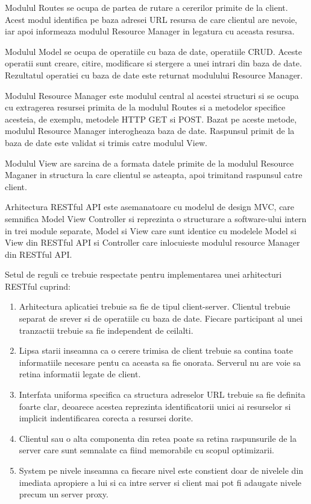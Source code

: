 Modulul Routes se ocupa de partea de rutare a cererilor primite de la client. Acest modul identifica pe baza adresei URL resursa de care clientul are nevoie, 
iar apoi informeaza modulul Resource Manager in legatura cu aceasta resursa.

Modulul Model se ocupa de operatiile cu baza de date, operatiile CRUD. Aceste operatii sunt creare, citire, modificare si stergere a unei intrari din 
baza de date. Rezultatul operatiei cu baza de date este returnat modulului Resource Manager.

Modulul Resource Manager este modulul central al acestei structuri si se ocupa cu extragerea resursei primita de la modulul Routes si a metodelor specifice 
acesteia, de exemplu, metodele HTTP GET si POST. Bazat pe aceste metode, modulul Resource Manager interogheaza baza de date. Raspunsul primit de la baza de date 
este validat si trimis catre modulul View.

Modulul View are sarcina de a formata datele primite de la modulul Resource Maganer in structura la care clientul se asteapta, apoi trimitand raspunsul catre 
client. 

Arhitectura RESTful API este asemanatoare cu modelul de design MVC, care semnifica Model View Controller si reprezinta o structurare a software-ului intern 
in trei module separate, Model si View care sunt identice cu modelele Model si View din RESTful API si Controller care inlocuieste modulul resource Manager 
din RESTful API.

Setul de reguli ce trebuie respectate pentru implementarea unei arhitecturi RESTful cuprind:
\begin{enumerate}
	\item Arhitectura aplicatiei trebuie sa fie de tipul client-server. Clientul trebuie separat de srever si de operatiile cu baza de date. Fiecare 
    participant al unei tranzactii trebuie sa fie independent de ceilalti.
	\item Lipsa starii inseamna ca o cerere trimisa de client trebuie sa contina toate informatiile necesare pentu ca aceasta sa fie onorata. Serverul 
	nu are voie sa retina informatii legate de client.
    \item Interfata uniforma specifica ca structura adreselor URL trebuie sa fie definita foarte clar, deoarece acestea reprezinta identificatorii unici 
    ai resurselor si implicit indentificarea corecta a resursei dorite.
    \item Clientul sau o alta componenta din retea poate sa retina raspunsurile de la server care sunt semnalate ca fiind memorabile cu scopul 
    optimizarii. 
    \item System pe nivele inseamna ca fiecare nivel este constient doar de nivelele din imediata apropiere a lui si ca intre server si client mai pot fi 
    adaugate nivele precum un server proxy.
\end{enumerate}

